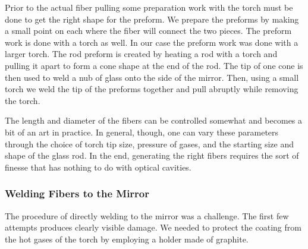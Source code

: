 Prior to the actual fiber pulling some preparation work with the torch must
be done to get the right shape for the preform.
We prepare the preforms by making a small point on each where the fiber will
connect the two pieces.
The preform work is done with a torch as well.
In our case the preform work was done with a larger torch.
The rod preform is created by heating a rod with a torch and pulling it apart
to form a cone shape at the end of the rod.
The tip of one cone is then used to weld a nub of glass onto the side of the
mirror.
Then, using a small torch we weld the tip of the preforms together and pull
abruptly while removing the torch.

The length and diameter of the fibers can be controlled somewhat and becomes
a bit of an art in practice.
In general, though, one can vary these parameters
through the choice of torch tip size, pressure of gases, and the starting size
and shape of the glass rod.
In the end, generating the right fibers requires the sort of finesse that has
nothing to do with optical cavities.





\subsubsection{Welding Fibers to the Mirror}

The procedure of directly welding to the mirror was a challenge.
The first few attempts produces clearly visible damage.
We needed to protect the coating from the hot gases of the torch
by employing a holder made of graphite.

